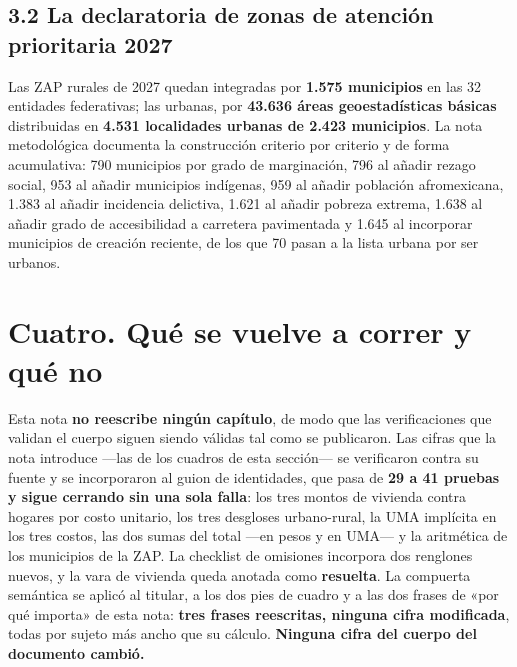 \subsection*{3.2 La declaratoria de zonas de atención prioritaria 2027}

Las ZAP rurales de 2027 quedan integradas por \textbf{1.575 municipios} en las 32 entidades
federativas; las urbanas, por \textbf{43.636 áreas geoestadísticas básicas} distribuidas en
\textbf{4.531 localidades urbanas de 2.423 municipios}. La nota metodológica documenta la
construcción criterio por criterio y de forma acumulativa: 790 municipios por grado de
marginación, 796 al añadir rezago social, 953 al añadir municipios indígenas, 959 al añadir
población afromexicana, 1.383 al añadir incidencia delictiva, 1.621 al añadir pobreza
extrema, 1.638 al añadir grado de accesibilidad a carretera pavimentada y 1.645 al incorporar
municipios de creación reciente, de los que 70 pasan a la lista urbana por ser urbanos.


\section*{Cuatro. Qué se vuelve a correr y qué no}

Esta nota \textbf{no reescribe ningún capítulo}, de modo que las verificaciones que validan
el cuerpo siguen siendo válidas tal como se publicaron. Las cifras que la nota introduce
---las de los cuadros de esta sección--- se verificaron contra su fuente y se incorporaron al
guion de identidades, que pasa de \textbf{29 a 41 pruebas y sigue cerrando sin una sola
falla}: los tres montos de vivienda contra hogares por costo unitario, los tres desgloses
urbano-rural, la UMA implícita en los tres costos, las dos sumas del total ---en pesos y en
UMA--- y la aritmética de los municipios de la ZAP. La checklist de omisiones incorpora dos
renglones nuevos, y la vara de vivienda queda anotada como \textbf{resuelta}. La compuerta
semántica se aplicó al titular, a los dos pies de cuadro y a las dos frases de «por qué
importa» de esta nota: \textbf{tres frases reescritas, ninguna cifra modificada}, todas por
sujeto más ancho que su cálculo. \textbf{Ninguna cifra del cuerpo del documento cambió.}

